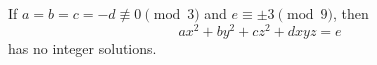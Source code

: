 \begin{proposition}
    If $a=b=c=-d\not\equiv0\pmod3$ and $e\equiv\pm3\pmod9$, then
\[
    ax^2+by^2+cz^2+dxyz=e
\]
    has no integer solutions.
\end{proposition}
